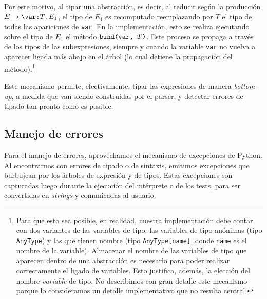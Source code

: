 \documentclass[11pt]{article}
\begin{document}
Por este motivo, al tipar una abstracción, es decir, al reducir según la
producción $E \rightarrow \verb|\var:| T \verb|.| E_1$, el tipo de
$E_1$ es recomputado reemplazando por $T$ el tipo de todas las apariciones de
\verb|var|. En la implementación, esto se realiza ejecutando sobre el tipo de 
$E_1$ el método $\verb|bind(var, |T\verb|)|$. Este proceso se propaga a través
de los tipos de las subexpresiones, siempre y cuando la variable \verb|var|
no vuelva a aparecer ligada más abajo en el árbol (lo cual detiene la
propagación del método).\footnote{Para que esto sea posible, en 
realidad, nuestra implementación debe contar con dos variantes de las
variables de tipo: las variables de tipo anónimas (tipo \texttt{AnyType}) y
las que tienen nombre (tipo \texttt{AnyType[name]}, donde \texttt{name} es el
nombre de la variable). Almacenar el nombre de las variables de tipo que
aparecen dentro de una abstracción es necesario para poder realizar
correctamente el ligado de variables. Esto justifica, además, la elección del
nombre \emph{variable} de tipo. No describimos con gran detalle este mecanismo
porque lo consideramos un detalle implementativo que no resulta central.}


Este mecanismo permite, efectivamente, tipar las expresiones de manera
\emph{bottom-up}, a medida que van siendo construidas por el parser, y
detectar errores de tipado tan pronto como es posible.


\subsection{Manejo de errores}

Para el manejo de errores, aprovechamos el mecanismo de excepciones de Python. Al encontrarnos con errores de tipado o de sintaxis, emitimos excepciones que burbujean por los árboles de expresión y de tipos. Estas excepciones son capturadas luego durante la ejecución del intérprete o de los tests, para ser convertidas en \emph{strings} y comunicadas al usuario.

\end{document}

